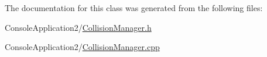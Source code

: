 The documentation for this class was generated from the following files\+:\begin{DoxyCompactItemize}
\item 
Console\+Application2/\hyperlink{_collision_manager_8h}{Collision\+Manager.\+h}\item 
Console\+Application2/\hyperlink{_collision_manager_8cpp}{Collision\+Manager.\+cpp}\end{DoxyCompactItemize}
